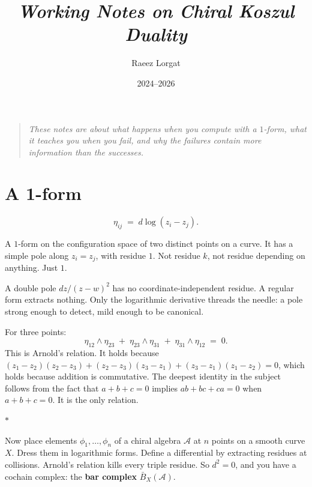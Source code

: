 \documentclass[11pt]{article}
\title{\textit{Working Notes on Chiral Koszul Duality}}
\author{Raeez Lorgat}
\date{2024--2026}
\newcommand{\cA}{\mathcal{A}}
\newcommand{\B}{\bar{B}}
\newcommand{\sep}{\bigskip\begin{center}$*$\end{center}\medskip}
\begin{document}
\maketitle

\begin{quote}
\itshape
These notes are about what happens when you compute with a
$1$-form, what it teaches you when you fail, and why the failures
contain more information than the successes.
\end{quote}

\tableofcontents

\section{A 1-form}
\label{sec:one-form}

\begin{equation}\label{eq:seed}
\eta_{ij} \;=\; d\log(z_i - z_j).
\end{equation}

A $1$-form on the configuration space of two distinct points on a
curve.  It has a simple pole along $z_i = z_j$, with residue $1$.
Not residue $k$, not residue depending on anything.  Just $1$.

A double pole $dz/(z-w)^2$ has no coordinate-independent residue.
A regular form extracts nothing.  Only the logarithmic derivative
threads the needle: a pole strong enough to detect, mild enough
to be canonical.

For three points:
\begin{equation}\label{eq:arnold}
\eta_{12} \wedge \eta_{23}
\;+\; \eta_{23} \wedge \eta_{31}
\;+\; \eta_{31} \wedge \eta_{12}
\;=\; 0.
\end{equation}
This is Arnold's relation.  It holds because $(z_1 - z_2)(z_2 - z_3)
+ (z_2 - z_3)(z_3 - z_1) + (z_3 - z_1)(z_1 - z_2) = 0$, which
holds because addition is commutative.  The deepest identity in the
subject follows from the fact that $a + b + c = 0$ implies
$ab + bc + ca = 0$ when $a + b + c = 0$.
It is the only relation.

\sep

Now place elements $\phi_1, \ldots, \phi_n$ of a chiral algebra
$\cA$ at $n$ points on a smooth curve $X$.  Dress them in
logarithmic forms.  Define a differential by extracting residues
at collisions.  Arnold's relation kills every triple residue.
So $d^2 = 0$, and you have a cochain complex: the \textbf{bar
complex} $\B_X(\cA)$.
\end{document}
